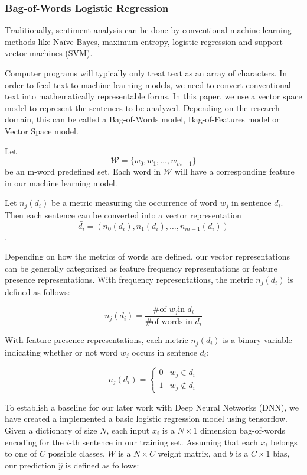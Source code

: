 \documentclass[conference]{IEEEtran}
\begin{document}
\subsubsection{Bag-of-Words Logistic Regression}
\label{model:core:bow}
    Traditionally, sentiment analysis can be done by conventional machine learning
    methods like Na\"ive Bayes, maximum entropy, logistic regression and 
    support vector machines (SVM). 
    
    Computer programs will typically only treat text as an array of characters.
    In order to feed text to machine learning models, we need to 
    convert conventional text into mathematically representable forms. In this
    paper, we use a vector space model to represent the sentences to be analyzed.
    Depending on the research domain, this can be called a Bag-of-Words model, 
    Bag-of-Features model or Vector Space model\cite{salton1975vector}.
    
    Let $$\mathcal{W}=\{w_0, w_1,\ldots, w_{m-1}\}$$ be an m-word predefined set. Each 
    word in $\mathcal{W}$ will have a corresponding feature in our machine learning model.
    
    Let $n_j(d_i)$ be a metric measuring the occurrence of word $w_j$
    in sentence $d_i$. Then each sentence can be converted into a vector representation 
    $$\bar{d_i}=(n_0(d_i),n_1(d_i),\ldots,n_{m-1}(d_i))$$.
    
    Depending on how the metrics of words are defined, our vector representations can be
    generally categorized as feature frequency representations or feature presence
    representations\cite{pang2002thumbs}. With frequency representations, the metric 
    $n_j(d_i)$ is defined as follows: 
     
    $$n_j(d_i) = \frac{\text{\# of }w_j \text{in } d_i}{\text{\# of words in } d_i}$$

    With feature presence representations, each metric $n_j(d_i)$ is a binary
    variable indicating whether or not word $w_j$ occurs in sentence $d_i$:
     
    $$n_j(d_i) = \begin{cases} 
    				0 & w_j \in d_i\\
      				1 & w_j \notin d_i
   		 	 \end{cases}
			$$
    
    To establish a baseline for our later work with Deep Neural Networks (DNN), we have
    created a implemented a basic logistic regression model using tensorflow. Given a 
    dictionary of size $N$, each input $x_i$ is a $N \times 1$ dimension bag-of-words encoding
    for the $i$-th sentence in our training set. Assuming that each $x_i$ belongs to one of $C$
    possible classes, $W$ is a $N \times C$ weight matrix, and $b$ is a $C \times 1$ bias,
    our prediction $\hat{y}$ is defined as follows:
        
\end{document}
